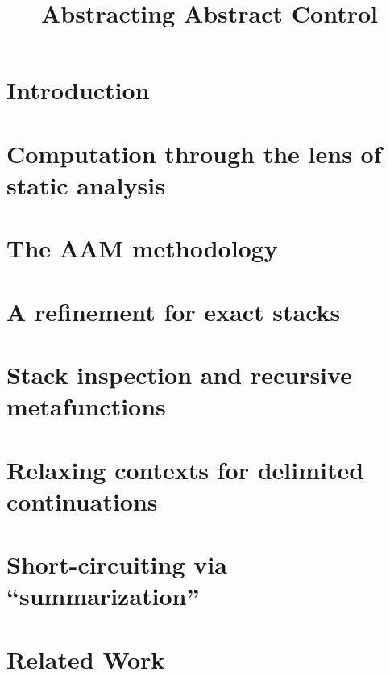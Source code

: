 \documentclass{sigplanconf}
\title{Abstracting Abstract Control\iftr{\\ \large{(Extended)}}}
\begin{document}
%
\maketitle


\begin{abstract}

\end{abstract}

\section{Introduction}

\section{Computation through the lens of static analysis}\label{sec:analysis} 

\section{The AAM methodology}
\label{sec:aam}

\section{A refinement for exact stacks}\label{sec:pushdown}

\section{Stack inspection and recursive metafunctions}\label{sec:inspection}

\section{Relaxing contexts for delimited continuations}\label{sec:delim}

\section{Short-circuiting via ``summarization''}\label{sec:memo}

\section{Related Work}

\end{document}
